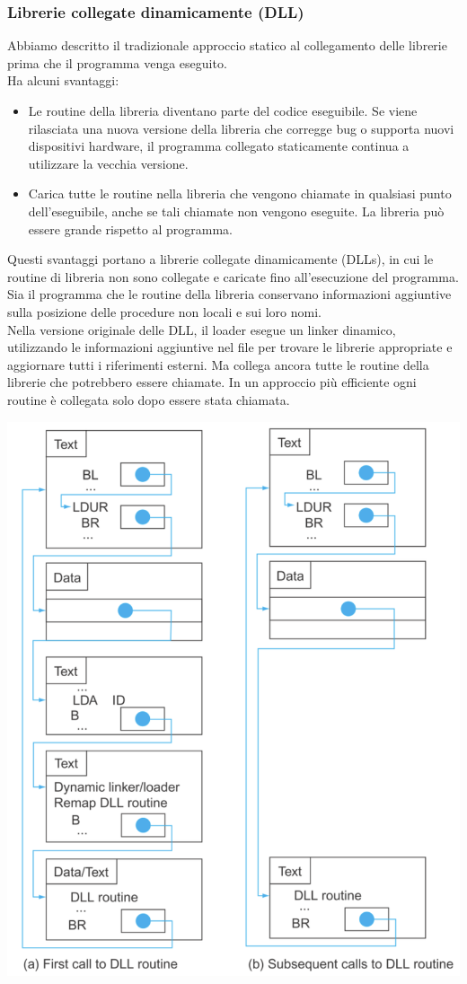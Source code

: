 \documentclass[12pt,a4paper]{article}
\begin{document}
\subsubsection{Librerie collegate dinamicamente (DLL)}
Abbiamo descritto il tradizionale approccio statico al collegamento delle librerie prima che il programma venga eseguito.\\
Ha alcuni svantaggi:
\begin{itemize}
\item Le routine della libreria diventano parte del codice eseguibile. Se viene rilasciata una nuova versione della libreria che corregge bug o supporta nuovi dispositivi hardware, il programma collegato staticamente continua a utilizzare la vecchia versione.
\item Carica tutte le routine nella libreria che vengono chiamate in qualsiasi punto dell'eseguibile, anche se tali chiamate non vengono eseguite. La libreria può essere grande rispetto al programma.
\end{itemize}
Questi svantaggi portano a librerie collegate dinamicamente (DLLs), in cui le routine di libreria non sono collegate e caricate fino all'esecuzione del programma. Sia il programma che le routine della libreria conservano informazioni aggiuntive sulla posizione delle procedure non locali e sui loro nomi.\\
Nella versione originale delle DLL, il loader esegue un linker dinamico, utilizzando le informazioni aggiuntive nel file per trovare le librerie appropriate e aggiornare tutti i riferimenti esterni. Ma collega ancora tutte le routine della librerie che potrebbero essere chiamate. In un approccio più efficiente ogni routine è collegata solo dopo essere stata chiamata.
\begin{center}
\includegraphics[width=0.5\columnwidth]{img/DLL_routine.png}
\end{center}
\end{document}
